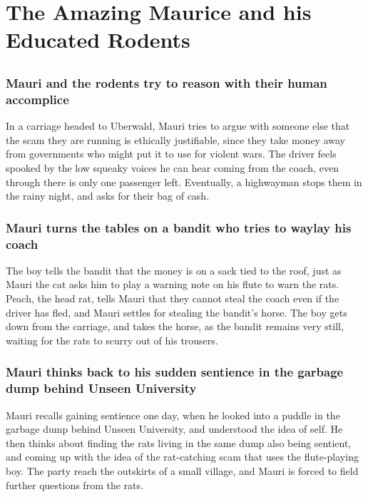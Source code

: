 \section{The Amazing Maurice and his Educated Rodents}


\subsection{}
\subsubsection{\Gls{Mauri} and the rodents try to reason with their human accomplice}
In a carriage headed to Uberwald, \Gls{Mauri} tries to argue with someone else that the scam they
are running is ethically justifiable, since they take money away from governments who might put it
to use for violent wars. The driver feels spooked by the low squeaky voices he can hear coming from
the coach, even through there is only one passenger left. Eventually, a highwayman stops them in the
rainy night, and asks for their bag of cash.

\subsubsection{\Gls{Mauri} turns the tables on a bandit who tries to waylay his coach}
The boy tells the bandit that the money is on a sack tied to the roof, just as \Gls{Mauri} the cat
asks him to play a warning note on his flute to warn the rats. \Gls{Peach}, the head rat, tells
\Gls{Mauri} that they cannot steal the coach even if the driver has fled, and \Gls{Mauri} settles
for stealing the bandit's horse. The boy gets down from the carriage, and takes the horse, as
the bandit remains very still, waiting for the rats to scurry out of his trousers.

\subsubsection{\Gls{Mauri} thinks back to his sudden sentience in the garbage dump behind
    Unseen University}
\Gls{Mauri} recalls gaining sentience one day, when he looked into a puddle in the garbage dump
behind Unseen University, and understood the idea of self. He then thinks about finding the rats
living in the same dump also being sentient, and coming up with the idea of the rat-catching scam
that uses the flute-playing boy. The party reach the outskirts of a small village, and \Gls{Mauri}
is forced to field further questions from the rats.

